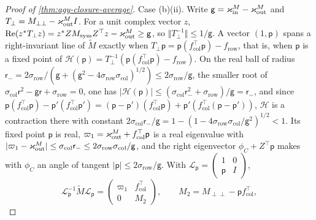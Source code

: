 \begin{proof}[Proof of \cref{thm:agy-closure-average}]
Case (b)(ii). Write $\mathsf g=\varkappa_{\mathrm{in}}^M-\varkappa_{\mathrm{out}}^M$ and $T_\perp=M_{\perp\perp}-\varkappa_{\mathrm{out}}^MI$. For a unit complex vector $z$, $\operatorname{Re}(z^\ast T_\perp z)=z^\ast ZM_{\mathrm{sym}}Z^\top z-\varkappa_{\mathrm{out}}^M\ge\mathsf g$, so $\Vert T_\perp^{-1}\Vert\le1/\mathsf g$. A vector $(1,\mathsf p)$ spans a right-invariant line of $\tilde M$ exactly when $T_\perp\mathsf p=\mathsf p(f_{\mathrm{col}}^\top\mathsf p)-f_{\mathrm{row}}$, that is, when $\mathsf p$ is a fixed point of $\mathcal H(\mathsf p)=T_\perp^{-1}(\mathsf p(f_{\mathrm{col}}^\top\mathsf p)-f_{\mathrm{row}})$. On the real ball of radius $\mathsf r_-=2\sigma_{\mathrm{row}}/(\mathsf g+(\mathsf g^2-4\sigma_{\mathrm{row}}\sigma_{\mathrm{col}})^{1/2})\le2\sigma_{\mathrm{row}}/\mathsf g$, the smaller root of $\sigma_{\mathrm{col}}\mathsf r^2-\mathsf g\mathsf r+\sigma_{\mathrm{row}}=0$, one has $\lvert\mathcal H(\mathsf p)\rvert\le(\sigma_{\mathrm{col}}\mathsf r_-^2+\sigma_{\mathrm{row}})/\mathsf g=\mathsf r_-$, and since $\mathsf p(f_{\mathrm{col}}^\top\mathsf p)-\mathsf p'(f_{\mathrm{col}}^\top\mathsf p')=(\mathsf p-\mathsf p')(f_{\mathrm{col}}^\top\mathsf p)+\mathsf p'(f_{\mathrm{col}}^\top(\mathsf p-\mathsf p'))$, $\mathcal H$ is a contraction there with constant $2\sigma_{\mathrm{col}}\mathsf r_-/\mathsf g=1-(1-4\sigma_{\mathrm{row}}\sigma_{\mathrm{col}}/\mathsf g^2)^{1/2}<1$. Its fixed point $\mathsf p$ is real, $\varpi_1=\varkappa_{\mathrm{out}}^M+f_{\mathrm{col}}^\top\mathsf p$ is a real eigenvalue with $\lvert\varpi_1-\varkappa_{\mathrm{out}}^M\rvert\le\sigma_{\mathrm{col}}\mathsf r_-\le2\sigma_{\mathrm{row}}\sigma_{\mathrm{col}}/\mathsf g$, and the right eigenvector $\phi_C+Z^\top\mathsf p$ makes with $\phi_C$ an angle of tangent $\lvert\mathsf p\rvert\le2\sigma_{\mathrm{row}}/\mathsf g$. With $\mathcal L_{\mathsf p}=\begin{pmatrix}1&0\\\mathsf p&I\end{pmatrix}$,
\begin{equation*}
\mathcal L_{\mathsf p}^{-1}\tilde M\mathcal L_{\mathsf p}=\begin{pmatrix}\varpi_1&f_{\mathrm{col}}^\top\\0&M_2\end{pmatrix},\qquad M_2=M_{\perp\perp}-\mathsf pf_{\mathrm{col}}^\top,
\end{equation*}

\end{proof}
